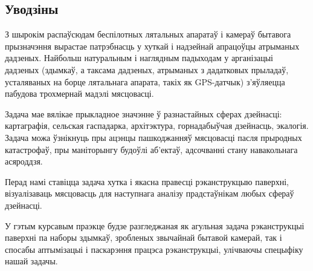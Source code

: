 \begin{center}
    \section*{Уводзіны}    
\end{center}

З шырокім распаўсюдам беспілотных лятальных апаратаў і камераў бытавога прызначэння вырастае патрэбнасць у хуткай і надзейнай апрацоўцы атрыманых дадзеных. Найбольш натуральным і наглядным падыходам у арганізацыі дадзеных (здымкаў, а таксама дадзеных, атрыманых з дадатковых прыладаў, усталяваных на борце лятальнага апарата, такіх як GPS-датчык) з'яўляецца пабудова трохмернай мадэлі мясцовасці.\par
Задача мае вялікае прыкладное значэнне ў разнастайных сферах дзейнасці: картаграфія, сельская гаспадарка, архітэктура, горнадабыўчая дзейнасць, экалогія. Задача можа ўзнікнуць пры ацэнцы пашкоджанняў мясцовасці пасля прыродных катастрофаў, пры маніторынгу будоўлі аб'ектаў, адсочванні стану навакольнага асяроддзя.\par
Перад намі ставіцца задача хутка і якасна правесці рэканструкцыю паверхні, візуалізаваць мясцовасць для наступнага аналізу прадстаўнікам любых сфераў дзейнасці.\par
У гэтым курсавым праэкце будзе разгледжаная як агульная задача рэканструкцыі паверхні па наборы здымкаў, зробленых звычайнай бытавой камерай, так і спосабы аптымізацыі і паскарэння працэса рэканструкцыі, улічваючы спецыфіку нашай задачы.\par

\newpage